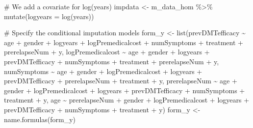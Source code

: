 \documentclass[
  letterpaper,
  DIV=11,
  numbers=noendperiod]{scrreprt}
\newenvironment{Shaded}{\begin{snugshade}}{\end{snugshade}}
\newcommand{\AttributeTok}[1]{\textcolor[rgb]{0.40,0.45,0.13}{#1}}
\newcommand{\CommentTok}[1]{\textcolor[rgb]{0.37,0.37,0.37}{#1}}
\newcommand{\FunctionTok}[1]{\textcolor[rgb]{0.28,0.35,0.67}{#1}}
\newcommand{\NormalTok}[1]{\textcolor[rgb]{0.00,0.23,0.31}{#1}}
\newcommand{\OtherTok}[1]{\textcolor[rgb]{0.00,0.23,0.31}{#1}}
\newcommand{\SpecialCharTok}[1]{\textcolor[rgb]{0.37,0.37,0.37}{#1}}
\begin{document}
\begin{Shaded}
\begin{Highlighting}[]
\CommentTok{\# We add a covariate for log(years)}
\NormalTok{impdata }\OtherTok{\textless{}{-}}\NormalTok{  m\_data\_hom }\SpecialCharTok{\%\textgreater{}\%} \FunctionTok{mutate}\NormalTok{(}\AttributeTok{logyears =} \FunctionTok{log}\NormalTok{(years))}

\CommentTok{\# Specify the conditional imputation models}
\NormalTok{form\_y }\OtherTok{\textless{}{-}} \FunctionTok{list}\NormalTok{(prevDMTefficacy }\SpecialCharTok{\textasciitilde{}}\NormalTok{ age }\SpecialCharTok{+}\NormalTok{ gender }\SpecialCharTok{+}\NormalTok{ logyears }\SpecialCharTok{+}\NormalTok{ logPremedicalcost }\SpecialCharTok{+} 
\NormalTok{                 numSymptoms }\SpecialCharTok{+}\NormalTok{ treatment }\SpecialCharTok{+}\NormalTok{ prerelapseNum }\SpecialCharTok{+}\NormalTok{ y,}
\NormalTok{               logPremedicalcost }\SpecialCharTok{\textasciitilde{}}\NormalTok{ age }\SpecialCharTok{+}\NormalTok{ gender }\SpecialCharTok{+}\NormalTok{ logyears }\SpecialCharTok{+}\NormalTok{ prevDMTefficacy }\SpecialCharTok{+} 
\NormalTok{                 numSymptoms }\SpecialCharTok{+}\NormalTok{ treatment }\SpecialCharTok{+}\NormalTok{ prerelapseNum }\SpecialCharTok{+}\NormalTok{ y,}
\NormalTok{               numSymptoms }\SpecialCharTok{\textasciitilde{}}\NormalTok{ age }\SpecialCharTok{+}\NormalTok{ gender }\SpecialCharTok{+}\NormalTok{ logPremedicalcost }\SpecialCharTok{+}\NormalTok{ logyears }\SpecialCharTok{+} 
\NormalTok{                 prevDMTefficacy }\SpecialCharTok{+}\NormalTok{ prerelapseNum }\SpecialCharTok{+}\NormalTok{ treatment }\SpecialCharTok{+}\NormalTok{ y,}
\NormalTok{               prerelapseNum }\SpecialCharTok{\textasciitilde{}}\NormalTok{ age }\SpecialCharTok{+}\NormalTok{ gender }\SpecialCharTok{+}\NormalTok{ logPremedicalcost }\SpecialCharTok{+}\NormalTok{ logyears }\SpecialCharTok{+} 
\NormalTok{                 prevDMTefficacy }\SpecialCharTok{+}\NormalTok{ numSymptoms }\SpecialCharTok{+}\NormalTok{ treatment }\SpecialCharTok{+}\NormalTok{ y,}
\NormalTok{               age }\SpecialCharTok{\textasciitilde{}}\NormalTok{ prerelapseNum }\SpecialCharTok{+}\NormalTok{ gender }\SpecialCharTok{+}\NormalTok{ logPremedicalcost }\SpecialCharTok{+}\NormalTok{ logyears }\SpecialCharTok{+} 
\NormalTok{                 prevDMTefficacy }\SpecialCharTok{+}\NormalTok{ numSymptoms }\SpecialCharTok{+}\NormalTok{ treatment }\SpecialCharTok{+}\NormalTok{ y)}
\NormalTok{form\_y }\OtherTok{\textless{}{-}} \FunctionTok{name.formulas}\NormalTok{(form\_y)}
\end{Highlighting}
\end{Shaded}
\end{document}
